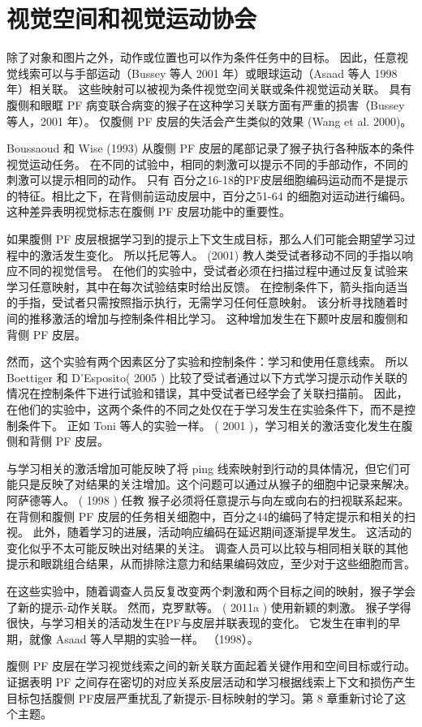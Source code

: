 \section{视觉空间和视觉运动协会}
\par
除了对象和图片之外，动作或位置也可以作为条件任务中的目标。 因此，任意视觉线索可以与手部运动（Bussey 等人 2001 年）或眼球运动（Asaad 等人 1998 年）相关联。 这些映射可以被视为条件视觉空间关联或条件视觉运动关联。 具有腹侧和眼眶 PF 病变联合病变的猴子在这种学习关联方面有严重的损害（Bussey 等人，2001 年）。 仅腹侧 PF 皮层的失活会产生类似的效果 (Wang et al. 2000)。
\par
Boussaoud 和 Wise (1993) 从腹侧 PF 皮层的尾部记录了猴子执行各种版本的条件视觉运动任务。 在不同的试验中，相同的刺激可以提示不同的手部动作，不同的刺激可以提示相同的动作。 只有 百分之16-18的PF皮层细胞编码运动而不是提示的特征。相比之下，在背侧前运动皮层中，百分之51-64 的细胞对运动进行编码。 这种差异表明视觉标志在腹侧 PF 皮层功能中的重要性。
\par
如果腹侧 PF 皮层根据学习到的提示上下文生成目标，那么人们可能会期望学习过程中的激活发生变化。 所以托尼等人。 (2001) 教人类受试者移动不同的手指以响应不同的视觉信号。 在他们的实验中，受试者必须在扫描过程中通过反复试验来学习任意映射，其中在每次试验结束时给出反馈。 在控制条件下，箭头指向适当的手指，受试者只需按照指示执行，无需学习任何任意映射。 该分析寻找随着时间的推移激活的增加与控制条件相比学习。 这种增加发生在下颞叶皮层和腹侧和背侧 PF 皮层。
\par
然而，这个实验有两个因素区分了实验和控制条件：学习和使用任意线索。 所以 Boettiger 和 D’Esposito( 2005 ) 比较了受试者通过以下方式学习提示动作关联的情况在控制条件下进行试验和错误，其中受试者已经学会了关联扫描前。 因此，在他们的实验中，这两个条件的不同之处仅在于学习发生在实验条件下，而不是控制条件下。 正如 Toni 等人的实验一样。 ( 2001 )，学习相关的激活变化发生在腹侧和背侧 PF 皮层。
\par
 与学习相关的激活增加可能反映了将 ping 线索映射到行动的具体情况，但它们可能只是反映了对结果的关注增加。这个问题可以通过从猴子的细胞中记录来解决。 阿萨德等人。 ( 1998 ) 任教
猴子必须将任意提示与向左或向右的扫视联系起来。 在背侧和腹侧 PF 皮层的任务相关细胞中，百分之44的编码了特定提示和相关的扫视。 此外，随着学习的进展，活动响应编码在延迟期间逐渐提早发生。 这活动的变化似乎不太可能反映出对结果的关注。 调查人员可以比较与相同相关联的其他提示和眼跳组合结果，从而排除注意力和结果编码效应，至少对于这些细胞而言。
\par
在这些实验中，随着调查人员反复改变两个刺激和两个目标之间的映射，猴子学会了新的提示-动作关联。 然而，克罗默等。 ( 2011a ) 使用新颖的刺激。 猴子学得很快，与学习相关的活动发生在PF与皮层并联表现的变化。 它发生在审判的早期，就像 Asaad 等人早期的实验一样。 （1998）。
\begin{enumerate}
\par
腹侧 PF 皮层在学习视觉线索之间的新关联方面起着关键作用和空间目标或行动。 证据表明 PF 之间存在密切的对应关系皮层活动和学习根据线索上下文和损伤产生目标包括腹侧 PF皮层严重扰乱了新提示-目标映射的学习。第 8 章重新讨论了这个主题。
\end{enumerate}
